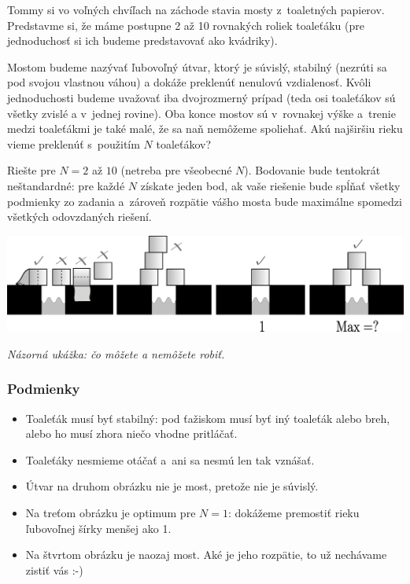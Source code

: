 Tommy si vo voľných chvíľach na záchode stavia mosty z~toaletných papierov.
Predstavme si, že máme postupne 2 až 10 rovnakých roliek toaleťáku (pre jednoduchosť si ich budeme predstavovať ako kvádriky).

Mostom budeme nazývať ľubovoľný útvar, ktorý je súvislý,
stabilný (nezrúti sa pod svojou vlastnou váhou) a dokáže preklenúť nenulovú vzdialenosť.
Kvôli jednoduchosti budeme uvažovať iba dvojrozmerný prípad (teda osi toaleťákov sú všetky zvislé a v~jednej rovine).
Oba konce mostov sú v~rovnakej výške a~trenie medzi toaleťákmi je také malé, že sa naň nemôžeme spoliehať.
Akú najširšiu rieku vieme preklenúť s~použitím $N$ toaleťákov?

Riešte pre $N = 2$ až $10$ (netreba pre všeobecné $N$).
Bodovanie bude tentokrát neštandardné: pre každé $N$ získate jeden bod,
ak vaše riešenie bude spĺňať všetky podmienky zo zadania a~zároveň rozpätie vášho mosta
bude maximálne spomedzi všetkých odovzdaných riešení.

\includegraphics[width = \textwidth]{sources/mosty.eps}

\emph{Názorná ukážka: čo môžete a nemôžete robiť.}

\subsubsection{Podmienky}
\begin{itemize}
    \item Toaleťák musí byť stabilný: pod ťažiskom musí byť iný toaleťák alebo breh, alebo ho musí zhora niečo vhodne pritláčať.
    \item Toaleťáky nesmieme otáčať a~ani sa nesmú len tak vznášať.
    \item Útvar na druhom obrázku nie je most, pretože nie je súvislý.
    \item Na treťom obrázku je optimum pre $N = 1$: dokážeme premostiť rieku ľubovoľnej šírky menšej ako 1.
    \item Na štvrtom obrázku je naozaj most. Aké je jeho rozpätie, to už nechávame zistiť vás :-)
\end{itemize}